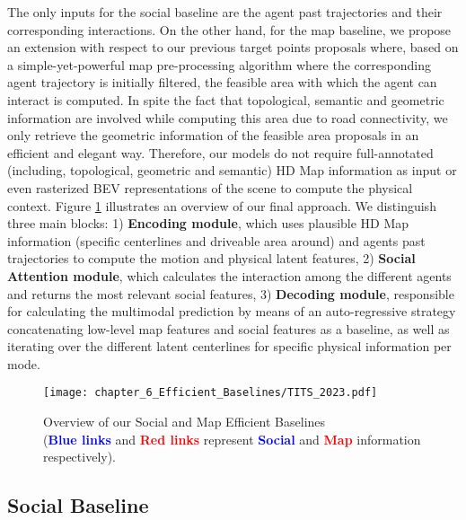 The only inputs for the social baseline are the agent past trajectories and their corresponding interactions. On the other hand, for the map baseline, we propose an extension with respect to our previous target points proposals where, based on a simple-yet-powerful map pre-processing algorithm where the corresponding agent trajectory is initially filtered, the feasible area with which the agent can interact is computed. In spite the fact that topological, semantic and geometric information are involved while computing this area due to road connectivity, we only retrieve the geometric information of the feasible area proposals in an efficient and elegant way. Therefore, our models do not require full-annotated (including, topological, geometric and semantic) HD Map information as input or even rasterized \ac{BEV} representations of the scene to compute the physical context. Figure \ref{fig:chapter_6_Efficient_Baselines/TITS_2023} illustrates an overview of our final approach. We distinguish three main blocks: 1) \textbf{Encoding module}, which uses plausible HD Map information (specific centerlines and driveable area around) and agents past trajectories to compute the motion and physical latent features, 2) \textbf{Social Attention module}, which calculates the interaction among the different agents and returns the most relevant social features, 3) \textbf{Decoding module}, responsible for calculating the multimodal prediction by means of an auto-regressive strategy concatenating low-level map features and social features as a baseline, as well as iterating over the different latent centerlines for specific physical information per mode.

\begin{figure}[!h]
	\centering
	\setlength{\tabcolsep}{2.0pt}
	\texttt{[image: chapter\_6\_Efficient\_Baselines/TITS\_2023.pdf]}
	\caption[Overview of our Social and Map Efficient Baselines]{Overview of our Social and Map Efficient Baselines \\ (\textbf{\textcolor{blue}{Blue links}} and \textbf{\textcolor{red}{Red links}} represent \textbf{\textcolor{blue}{Social}} and \textbf{\textcolor{red}{Map}} information respectively).}
	\label{fig:chapter_6_Efficient_Baselines/TITS_2023}
\end{figure}

\subsection{Social Baseline}
\label{subsec:6_efficient_baselines_social}


